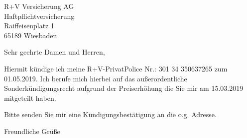 \documentclass[version=last, Briefvorlage]{scrlttr2}
\begin{document}
%
\begin{letter}{%
R+V Versicherung AG \\
Haftpflichtversicherung \\
Raiffeisenplatz 1 \\
65189 Wiesbaden \\
	}
	\opening{Sehr geehrte Damen und Herren,}
	Hiermit kündige ich meine R+V-PrivatPolice Nr.: 301 34 350637265 zum 01.05.2019. Ich berufe mich hierbei auf das außerordentliche 
	Sonderkündigungsrecht aufgrund der Preiserhöhung die Sie mir am 15.03.2019 mitgeteilt haben. 
	
	Bitte senden Sie mir eine Kündigungsbestätigung an die o.g. Adresse. 
	\closing{Freundliche Grüße}
\end{letter}
%
\end{document}
